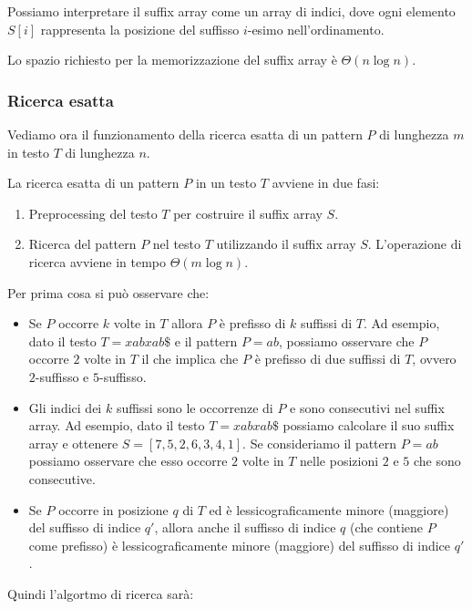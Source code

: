 Possiamo interpretare il suffix array come un array di indici, dove ogni elemento
$S[i]$ rappresenta la posizione del suffisso $i$-esimo nell'ordinamento.

Lo spazio richiesto per la memorizzazione del suffix array è $\Theta(n \log n)$.
\subsubsection{Ricerca esatta}
Vediamo ora il funzionamento della ricerca esatta di un pattern $P$ di lunghezza
$m$ in testo $T$ di lunghezza $n$.

La ricerca esatta di un pattern $P$ in un testo $T$ avviene in due fasi:
\begin{enumerate}
    \item Preprocessing del testo $T$ per costruire il suffix array $S$.
    \item Ricerca del pattern $P$ nel testo $T$ utilizzando il suffix array $S$.
          L'operazione di ricerca avviene in tempo $\Theta(m \log n)$.
\end{enumerate}
Per prima cosa si può osservare che:
\begin{itemize}
    \item Se $P$ occorre $k$ volte in $T$ allora $P$ è prefisso di $k$ suffissi
          di $T$. Ad esempio, dato il testo $T = xabxab\$$ e il pattern $P = ab$,
          possiamo osservare che $P$ occorre $2$ volte in $T$ il che implica che
          $P$ è prefisso di due suffissi di $T$, ovvero $2$-suffisso e
          $5$-suffisso.
    \item Gli indici dei $k$ suffissi sono le occorrenze di $P$ e sono consecutivi
          nel suffix array. Ad esempio, dato il testo $T = xabxab\$$ possiamo
          calcolare il suo suffix array e ottenere $S=[7, 5, 2, 6, 3, 4, 1]$. Se
          consideriamo il pattern $P = ab$ possiamo osservare che  esso occorre
          $2$ volte in $T$ nelle posizioni $2$ e $5$ che sono consecutive.
    \item Se $P$ occorre in posizione $q$ di $T$ ed è lessicograficamente minore
          (maggiore) del suffisso di indice $q'$, allora anche il suffisso di
          indice $q$ (che contiene $P$ come prefisso) è lessicograficamente
          minore (maggiore) del suffisso di indice $q'$.
\end{itemize}
Quindi l'algortmo di ricerca sarà:
